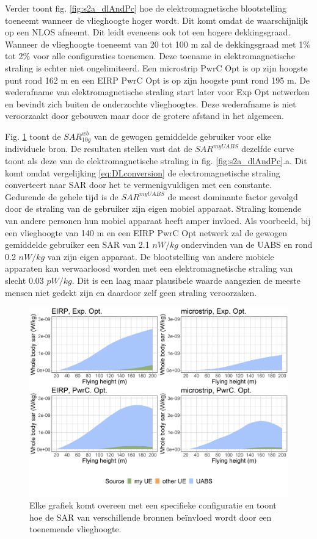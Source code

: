 \documentclass[twocolumn]{phdsymp_dutch}
\begin{document}
Verder toont fig.  \ref{fig:s2a_dlAndPc} hoe de elektromagnetische blootstelling toeneemt wanneer de vlieghoogte hoger wordt. 
Dit komt omdat de waarschijnlijk op een \gls{NLOS} afneemt.
Dit leidt eveneens ook tot een hogere dekkingsgraad.
Wanneer de vlieghoogte toeneemt van 20 tot 100 m zal de dekkingsgraad met 1\% tot 2\% voor alle configuraties toenemen.
Deze toename in elektromagnetische straling is echter niet ongelimiteerd. Een microstrip \gls{PwrC Opt}
is op zijn hoogste punt rond 162 m en een \gls{EIRP} \gls{PwrC Opt} is op zijn hoogste punt rond 195 m.
De wederafname van elektromagnetische straling start later voor \gls{Exp Opt} netwerken 
en bevindt zich buiten de onderzochte vlieghoogtes. 
Deze wederafname is niet veroorzaakt door gebouwen maar door de grotere afstand in het algemeen.

Fig. \ref{fig:s2shfourSourcesMatrix} toont de $SAR^{wb}_{10g}$ van de gewogen gemiddelde gebruiker voor elke individuele bron.
De resultaten stellen vast dat de $SAR^{myUABS}$ dezelfde curve toont als deze van de elektromagnetische straling in fig. \ref{fig:s2a_dlAndPc}.a. Dit komt omdat vergelijking \ref{eq:DLconversion} de electromagnetische straling converteert naar \gls{SAR}
door het te vermenigvuldigen met een constante. Gedurende de gehele tijd is de $SAR^{myUABS}$
de meest dominante factor gevolgd door de straling van de gebruiker zijn eigen mobiel apparaat.
Straling komende van andere personen hun mobiel apparaat heeft amper invloed.
Als voorbeeld, bij een vlieghoogte van 140 m en een \gls{EIRP} \gls{PwrC Opt} netwerk
zal de gewogen gemiddelde gebruiker een \gls{SAR} van
2.1 $nW/kg$ ondervinden van de  \gls{UABS} en rond
 0.2 $nW/kg$ van zijn eigen apparaat.
De blootstelling van andere mobiele apparaten kan verwaarloosd worden met een elektromagnetische straling van slecht
 0.03 $pW/kg$. Dit is een laag maar plausibele waarde aangezien de meeste mensen niet gedekt zijn 
en daardoor zelf geen straling veroorzaken.


\begin{figure}[h!]
  \includegraphics[width=\linewidth]{s2/fhFourSources.png}
  \caption{Elke grafiek komt overeen met een specifieke configuratie en toont hoe de 
     \acs{SAR} van verschillende bronnen be\"invloed wordt door een toenemende vlieghoogte.}
  \label{fig:s2shfourSourcesMatrix}
\end{figure}
\end{document}
